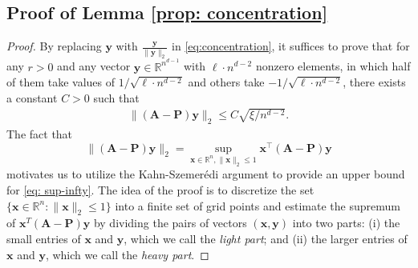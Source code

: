\documentclass{article}
\theoremstyle{plain}
\theoremstyle{definition}
\theoremstyle{remark}
\newcommand{\Br}{\mathbb{R}}
\newcommand{\BP}{\bm{P}}
\newcommand{\BA}{\bm{A}}
\def\bx{\bm{x}}
\def\by{\bm{y}}
\begin{document}
\begin{appendix}
\begin{center}
		\section{Proof of Lemma \ref{prop: concentration}}
		\begin{proof}
			By replacing $\by$ with $\frac{\by}{\| \by\|_2}$ in \eqref{eq:concentration}, it suffices to prove that for any $r > 0$ and any vector $\by\in \Br^{n^{d-1}}$ with $\ell \cdot n^{d-2}$ nonzero elements, in which half of them take values of $1/\sqrt{\ell \cdot n^{d-2}}$ and others take $-1/\sqrt{\ell \cdot n^{d-2}}$, there exists a constant $C>0$ such that 
			\begin{align*}
				\| (\BA - \BP) \by \|_2 \leq C\sqrt{\xi/n^{d-2}}.
			\end{align*}
			The fact that
			\begin{equation} \label{eq: sup-infty}
				\| (\BA - \BP) \by \|_2 = \sup_{\bx \in \Br^n, \| \bx\|_2 \leq 1} \bx^\top (\BA - \BP) \by
			\end{equation}
			motivates us to utilize the Kahn-Szemer{\'e}di argument to provide an upper bound for \eqref{eq: sup-infty}.  The idea of the proof is to discretize the set $\{\bx \in \Br^n \colon \| \bx\|_2 \leq 1\}$ into a finite set of grid points and estimate the supremum of $\bm{x}^T(\bm{A} - \bm{P})\bm{y}$ by dividing the pairs of vectors $(\bm{x}, \bm{y})$ into two parts: (i) the small entries of $\bm{x}$ and $\bm{y}$, which we call the \emph{light part}; and (ii) the larger entries of $\bm{x}$ and $\bm{y}$, which we call the \emph{heavy part}.
			

\end{proof}
\end{center}
\end{appendix}
\end{document}

